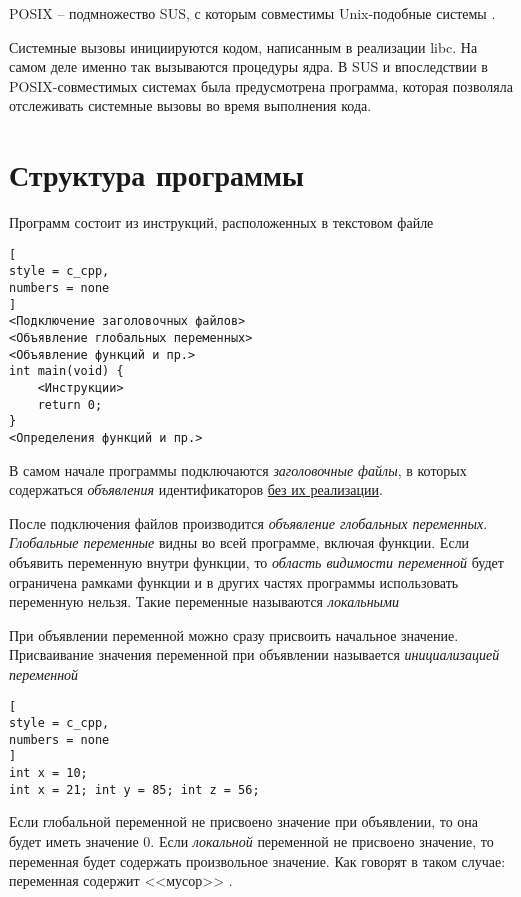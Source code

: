 \documentclass[%
	11pt,
	a4paper,
	utf8,
		]{article}
\begin{document}
POSIX -- подмножество SUS, с которым совместимы Unix-подобные системы \cite[]{amini-extreme-c:2022}.

Системные вызовы инициируются кодом, написанным в реализации libc. На самом деле именно так вызываются процедуры ядра. В SUS и впоследствии в POSIX-совместимых системах была предусмотрена программа, которая позволяла отслеживать системные вызовы во время выполнения кода.









\section{Структура программы}

Программ состоит из инструкций, расположенных в текстовом файле
\begin{lstlisting}[
style = c_cpp,
numbers = none
]
<Подключение заголовочных файлов>
<Объявление глобальных переменных>
<Объявление функций и пр.>
int main(void) {
    <Инструкции>
    return 0;
}
<Определения функций и пр.>
\end{lstlisting}

В самом начале программы подключаются \emph{заголовочные файлы}, в которых содержаться \emph{объявления} идентификаторов \underline{без их реализации}.

После подключения файлов производится \emph{объявление глобальных переменных}. \emph{Глобальные переменные} видны во всей программе, включая функции. Если объявить переменную внутри функции, то \emph{область видимости переменной} будет ограничена рамками функции и в других частях программы использовать переменную нельзя. Такие переменные называются \emph{локальными}

При объявлении переменной можно сразу присвоить начальное значение. Присваивание значения переменной при объявлении называется \emph{инициализацией переменной}
\begin{lstlisting}[
style = c_cpp,
numbers = none
]
int x = 10;
int x = 21; int y = 85; int z = 56;
\end{lstlisting}

Если глобальной переменной не присвоено значение при объявлении, то она будет иметь значение 0. Если \emph{локальной} переменной не присвоено значение, то переменная будет содержать {\color{red}произвольное значение}. Как говорят в таком случае: переменная содержит <<мусор>> \cite[]{prokhorenok-prog-c:2020}.
\end{document}
